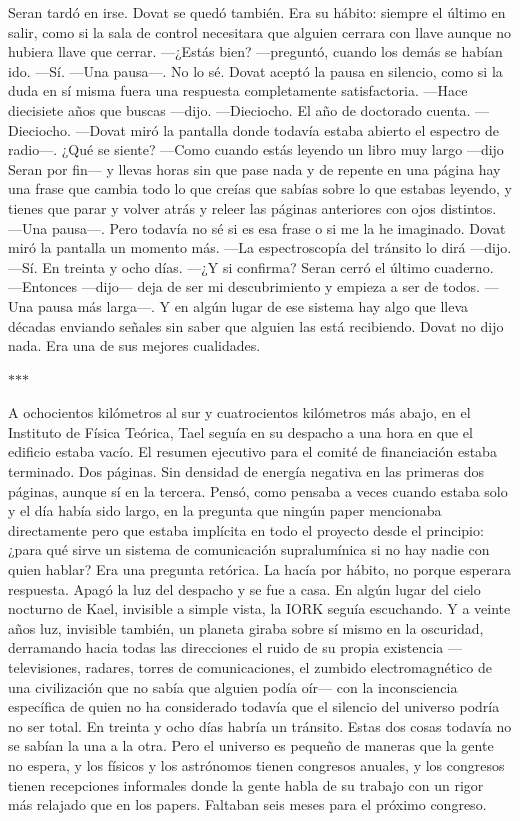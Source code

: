 \documentclass[11pt,a5paper,twoside]{book}
\begin{document}
Seran tardó en irse.
Dovat se quedó también. Era su hábito: siempre el último en salir, como si la sala de control necesitara que alguien cerrara con llave aunque no hubiera llave que cerrar.
—¿Estás bien? —preguntó, cuando los demás se habían ido.
—Sí. —Una pausa—. No lo sé.
Dovat aceptó la pausa en silencio, como si la duda en sí misma fuera una respuesta completamente satisfactoria.
—Hace diecisiete años que buscas —dijo.
—Dieciocho. El año de doctorado cuenta.
—Dieciocho. —Dovat miró la pantalla donde todavía estaba abierto el espectro de radio—. ¿Qué se siente?
—Como cuando estás leyendo un libro muy largo —dijo Seran por fin— y llevas horas sin que pase nada y de repente en una página hay una frase que cambia todo lo que creías que sabías sobre lo que estabas leyendo, y tienes que parar y volver atrás y releer las páginas anteriores con ojos distintos. —Una pausa—. Pero todavía no sé si es esa frase o si me la he imaginado.
Dovat miró la pantalla un momento más.
—La espectroscopía del tránsito lo dirá —dijo.
—Sí. En treinta y ocho días.
—¿Y si confirma?
Seran cerró el último cuaderno.
—Entonces —dijo— deja de ser mi descubrimiento y empieza a ser de todos. —Una pausa más larga—. Y en algún lugar de ese sistema hay algo que lleva décadas enviando señales sin saber que alguien las está recibiendo.
Dovat no dijo nada. Era una de sus mejores cualidades.
\vspace{1.5em}
\begin{center}$\ast$\quad$\ast$\quad$\ast$\end{center}
\vspace{1.5em}
A ochocientos kilómetros al sur y cuatrocientos kilómetros más abajo, en el Instituto de Física Teórica, Tael seguía en su despacho a una hora en que el edificio estaba vacío.
El resumen ejecutivo para el comité de financiación estaba terminado. Dos páginas. Sin densidad de energía negativa en las primeras dos páginas, aunque sí en la tercera.
Pensó, como pensaba a veces cuando estaba solo y el día había sido largo, en la pregunta que ningún paper mencionaba directamente pero que estaba implícita en todo el proyecto desde el principio: ¿para qué sirve un sistema de comunicación supralumínica si no hay nadie con quien hablar?
Era una pregunta retórica. La hacía por hábito, no porque esperara respuesta.
Apagó la luz del despacho y se fue a casa.
En algún lugar del cielo nocturno de Kael, invisible a simple vista, la IORK seguía escuchando.
Y a veinte años luz, invisible también, un planeta giraba sobre sí mismo en la oscuridad, derramando hacia todas las direcciones el ruido de su propia existencia —televisiones, radares, torres de comunicaciones, el zumbido electromagnético de una civilización que no sabía que alguien podía oír— con la inconsciencia específica de quien no ha considerado todavía que el silencio del universo podría no ser total.
En treinta y ocho días habría un tránsito.
Estas dos cosas todavía no se sabían la una a la otra. Pero el universo es pequeño de maneras que la gente no espera, y los físicos y los astrónomos tienen congresos anuales, y los congresos tienen recepciones informales donde la gente habla de su trabajo con un rigor más relajado que en los papers.
Faltaban seis meses para el próximo congreso.
\end{document}
